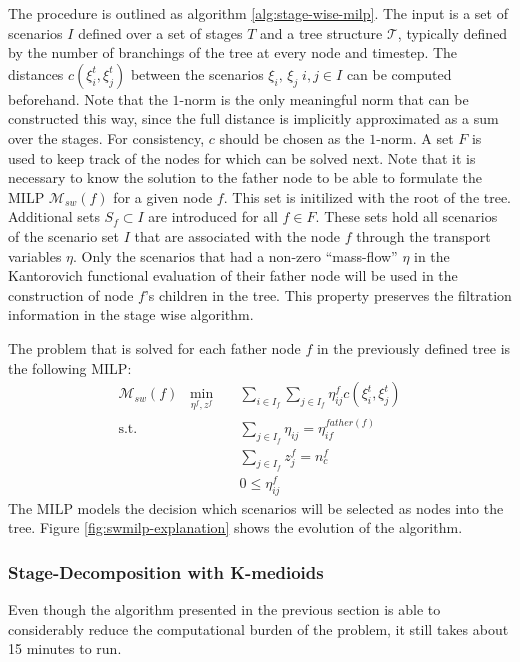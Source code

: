 The procedure is outlined as algorithm \ref{alg:stage-wise-milp}.
The input is a set of scenarios $I$ defined over a set of stages $T$ and a tree structure $\mathcal{T}$, typically defined by the number of branchings of the tree at every node and timestep.
The distances $c(\xi_i^t, \xi_j^t)$ between the scenarios $\xi_i,\,\xi_j\; i,j\in I$ can be computed beforehand.
Note that the $1$-norm is the only meaningful norm that can be constructed this way, since the full distance is implicitly approximated as a sum over the stages.
For consistency, $c$ should be chosen as the $1$-norm.
A set $F$ is used to keep track of the nodes for which can be solved next. Note that it is necessary to know the solution to the father node to be able to formulate the MILP $\mathcal{M}_{sw}(f)$ for a given node $f$. This set is initilized with the root of the tree. Additional sets $S_f\subset I$ are introduced for all $f\in F$. These sets hold all scenarios of the scenario set $I$ that are associated with the node $f$ through the transport variables $\eta$. Only the scenarios that had a non-zero ``mass-flow'' $\eta$ in the Kantorovich functional evaluation of their father node will be used in the construction of node $f$'s children in the tree. This property preserves the filtration information in the stage wise algorithm.

The problem that is solved for each father node $f$ in the previously defined tree is the following MILP:
\begin{eqnarray}
  \label{eq:small-milp-in-alg}
  \mathcal{M}_{sw}(f)\; \; \min_{\eta^f,z^f}&&\sum_{i\in I_f}\sum_{j\in I_f}\eta_{ij}^fc(\xi_i^t,\xi_j^t)\\
  \mathrm{s.t.}&&\sum_{j\in I_f}\eta_{ij} = \eta_{if}^{father(f)}\\
  &&\sum_{j\in I_f}z_j^f = n_c^f\\
  &&0\leq \eta_{ij}^f
\end{eqnarray}
The MILP models the decision which scenarios will be selected as nodes into the tree. Figure \ref{fig:swmilp-explanation} shows the evolution of the algorithm.

\subsubsection{Stage-Decomposition with K-medioids}
Even though the algorithm presented in the previous section is able to considerably reduce the computational burden of the problem, it still takes about 15 minutes to run. 
